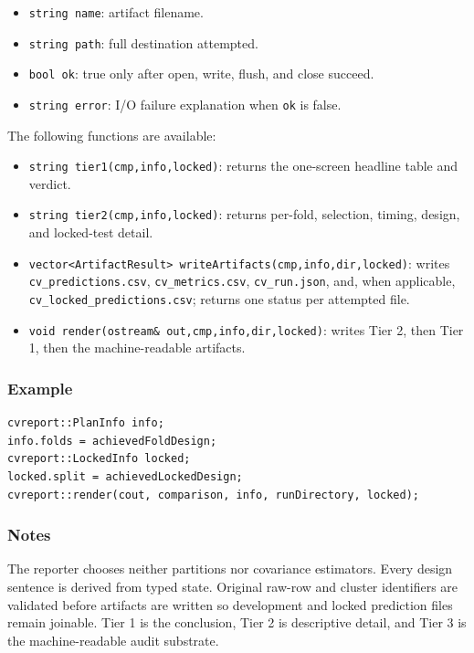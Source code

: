\begin{itemize}
\item \texttt{string name}: artifact filename.
\item \texttt{string path}: full destination attempted.
\item \texttt{bool ok}: true only after open, write, flush, and close succeed.
\item \texttt{string error}: I/O failure explanation when \texttt{ok} is false.
\end{itemize}

The following functions are available:

\begin{itemize}
\item \texttt{string tier1(cmp,info,locked)}: returns the one-screen headline
      table and verdict.
\item \texttt{string tier2(cmp,info,locked)}: returns per-fold, selection,
      timing, design, and locked-test detail.
\item \texttt{vector<ArtifactResult> writeArtifacts(cmp,info,dir,locked)}:
      writes \texttt{cv\_predictions.csv}, \texttt{cv\_metrics.csv},
      \texttt{cv\_run.json}, and, when applicable,
      \texttt{cv\_locked\_predictions.csv}; returns one status per attempted
      file.
\item \texttt{void render(ostream\& out,cmp,info,dir,locked)}: writes Tier 2,
      then Tier 1, then the machine-readable artifacts.
\end{itemize}

\subsubsection{Example}
\begin{verbatim}
cvreport::PlanInfo info;
info.folds = achievedFoldDesign;
cvreport::LockedInfo locked;
locked.split = achievedLockedDesign;
cvreport::render(cout, comparison, info, runDirectory, locked);
\end{verbatim}

\subsubsection{Notes}
The reporter chooses neither partitions nor covariance estimators.  Every design
sentence is derived from typed state.  Original raw-row and cluster identifiers
are validated before artifacts are written so development and locked prediction
files remain joinable.  Tier 1 is the conclusion, Tier 2 is descriptive detail,
and Tier 3 is the machine-readable audit substrate.

